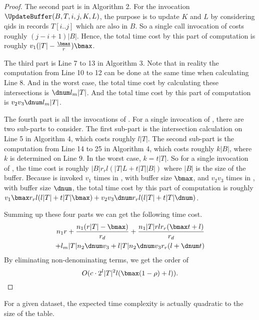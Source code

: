 \begin{proof}
The second part is \UpdateBuffer in Algorithm 2. For the invocation 
$\UpdateBuffer(B, T, i, j, K, L)$, the purpose is to update $K$ and $L$ 
by considering qids in records $T[i..j]$ which are also in $B$. 
So a single call invocation of \UpdateBuffer costs roughly $(j-i+1)|B|$.
Hence, the total time cost by this part of computation is roughly 
$v_1 (|T| - \frac{\bmax}{r}) \bmax$.

The third part is Line 7 to 13 in Algorithm 3. Note that in reality 
the computation from Line 10 to 12 can be done at the same time when 
calculating Line 8. And in the worst case, the total time cost by calculating
these intersections is $\dnum l_m |T|$. And the total time cost by
this part of computation is $v_2 v_3 \dnum l_m |T|$.

The fourth part is all the invocations of \SanitizeBuffer.
For a single invocation of \SanitizeBuffer, there are two sub-parts to consider. 
The first sub-part is the intersection calculation on Line 5 in Algorithm 4, 
which costs roughly $l |T|$.
The second sub-part is the computation from Line 14 to 25 in Algorithm 4,
which costs roughly $k |B|$, where $k$ is determined on Line $9$. 
In the worst case, $k= t |T|$. 
So for a single invocation of \SanitizeBuffer, the time cost is roughly
$|B| r_r l (|T| L + t |T| |B|)$ where $|B|$ is the size of the buffer.
Because \SanitizeBuffer is invoked $v_1$ times in \HandleShortRecords,
with buffer size $\bmax$, and $v_2 v_3$ times in \HandleLongRecord,
with buffer size $\dnum$, 
the total time cost by this part of computation is roughly
$v_1 \bmax r_r l (l |T| + t |T| \bmax) + v_2 v_3 \dnum r_r l (l |T| + t |T| \dnum)$. 

Summing up these four parts we can get the following time cost.
\begin{align*}
  n_1 r 
+ \frac{n_1 (r |T| - \bmax)}{r_d} 
+ \frac{n_1 |T| r l r_r (\bmax t + l)}{r_d} \\
+ l_m |T| n_2 \dnum v_3 
+ l |T| n_2 \dnum v_3 r_r (l + \dnum t)
\end{align*}
By eliminating non-denominating terms, we get the order of \[ O(c \cdot 2^l |T|^2 l (\bmax (1-\rho) + l) ) .\]
\end{proof}

For a given dataset, the expected time complexity is actually quadratic to the size of the table.


